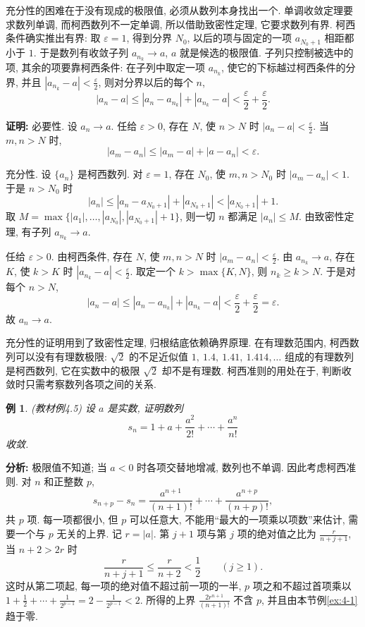 \documentclass[UTF8,openany]{ctexbook}
\theoremstyle{chinesetextbook}
\newtheorem{example}{例}[section]
\newenvironment{cnproof}{\par\indent\textbf{证明:} \ignorespaces}{\par}
\begin{document}
充分性的困难在于没有现成的极限值, 必须从数列本身找出一个. 单调收敛定理要求数列单调, 而柯西数列不一定单调, 所以借助致密性定理, 它要求数列有界. 柯西条件确实推出有界: 取 $\varepsilon=1$, 得到分界 $N_0$, 以后的项与固定的一项 $a_{N_0+1}$ 相距都小于 $1$. 于是数列有收敛子列 $a_{n_k}\to a$, $a$ 就是候选的极限值. 子列只控制被选中的项, 其余的项要靠柯西条件: 在子列中取定一项 $a_{n_k}$, 使它的下标越过柯西条件的分界, 并且 $\displaystyle|a_{n_k}-a|<\frac\varepsilon2$, 则对分界以后的每个 $n$,
\[
|a_n-a|\le|a_n-a_{n_k}|+|a_{n_k}-a|<\frac\varepsilon2+\frac\varepsilon2.
\]
\begin{cnproof}
必要性. 设 $a_n\to a$. 任给 $\varepsilon>0$, 存在 $N$, 使 $n>N$ 时 $\displaystyle|a_n-a|<\frac\varepsilon2$. 当 $m,n>N$ 时,
\[
|a_m-a_n|\le|a_m-a|+|a-a_n|<\varepsilon.
\]

充分性. 设 $\{a_n\}$ 是柯西数列. 对 $\varepsilon=1$, 存在 $N_0$, 使 $m,n>N_0$ 时 $|a_m-a_n|<1$. 于是 $n>N_0$ 时
\[
|a_n|\le|a_n-a_{N_0+1}|+|a_{N_0+1}|<|a_{N_0+1}|+1.
\]
取 $M=\max\{|a_1|,\ldots,|a_{N_0}|,|a_{N_0+1}|+1\}$, 则一切 $n$ 都满足 $|a_n|\le M$. 由致密性定理, 有子列 $a_{n_k}\to a$.

任给 $\varepsilon>0$. 由柯西条件, 存在 $N$, 使 $m,n>N$ 时 $\displaystyle|a_m-a_n|<\frac\varepsilon2$. 由 $a_{n_k}\to a$, 存在 $K$, 使 $k>K$ 时 $\displaystyle|a_{n_k}-a|<\frac\varepsilon2$. 取定一个 $k>\max\{K,N\}$, 则 $n_k\ge k>N$. 于是对每个 $n>N$,
\[
|a_n-a|\le|a_n-a_{n_k}|+|a_{n_k}-a|<\frac\varepsilon2+\frac\varepsilon2=\varepsilon.
\]
故 $a_n\to a$.
\end{cnproof}
充分性的证明用到了致密性定理, 归根结底依赖确界原理. 在有理数范围内, 柯西数列可以没有有理数极限: $\sqrt2$ 的不足近似值 $1,\ 1.4,\ 1.41,\ 1.414,\ldots$ 组成的有理数列是柯西数列, 它在实数中的极限 $\sqrt2$ 却不是有理数. 柯西准则的用处在于, 判断收敛时只需考察数列各项之间的关系.
\begin{example}
\textnormal{(教材例4.5)} 设 $a$ 是实数, 证明数列
\[
s_n=1+a+\frac{a^2}{2!}+\cdots+\frac{a^n}{n!}
\]
收敛.
\end{example}
\par\indent\textbf{分析:} 极限值不知道; 当 $a<0$ 时各项交替地增减, 数列也不单调. 因此考虑柯西准则. 对 $n$ 和正整数 $p$,
\[
s_{n+p}-s_n=\frac{a^{n+1}}{(n+1)!}+\cdots+\frac{a^{n+p}}{(n+p)!},
\]
共 $p$ 项. 每一项都很小, 但 $p$ 可以任意大, 不能用“最大的一项乘以项数”来估计, 需要一个与 $p$ 无关的上界. 记 $r=|a|$. 第 $j+1$ 项与第 $j$ 项的绝对值之比为 $\displaystyle\frac r{n+j+1}$, 当 $n+2>2r$ 时
\[
\frac r{n+j+1}\le\frac r{n+2}<\frac12\qquad(j\ge1).
\]
这时从第二项起, 每一项的绝对值不超过前一项的一半, $p$ 项之和不超过首项乘以 $\displaystyle1+\frac12+\cdots+\frac1{2^{p-1}}=2-\frac1{2^{p-1}}<2$. 所得的上界 $\displaystyle\frac{2r^{n+1}}{(n+1)!}$ 不含 $p$, 并且由本节例\ref{ex:4-1} 趋于零.
\end{document}
